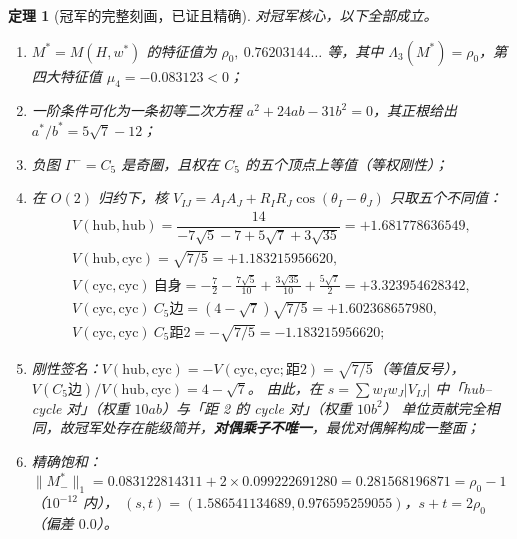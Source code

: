 \documentclass[UTF8,11pt]{ctexart}
\newtheorem{theorem}{定理}[section]
\theoremstyle{definition}
\newcommand{\Lam}{\Lambda}
\begin{document}
\begin{theorem}[冠军的完整刻画，已证且精确]\label{thm:champ}
对冠军核心，以下全部成立。
\begin{enumerate}[label=(\alph*),leftmargin=2em,itemsep=1pt]
\item $M^*=M(H,w^*)$ 的特征值为
$\rho_0,\ 0.76203144\ldots$ 等，其中 $\Lam_3(M^*)=\rho_0$，第四大特征值 $\mu_4=-0.083123<0$；
\item 一阶条件可化为一条初等二次方程 $a^2+24ab-31b^2=0$，其正根给出 $a^*/b^*=5\sqrt7-12$；
\item 负图 $\Gamma^-=C_5$ 是奇圈，且权在 $C_5$ 的五个顶点上等值（等权刚性）；
\item 在 $O(2)$ 归约下，核 $V_{IJ}=A_IA_J+R_IR_J\cos(\theta_I-\theta_J)$ 只取五个不同值：
\[
\begin{array}{lcl}
V(\text{hub},\text{hub})=\dfrac{14}{-7\sqrt5-7+5\sqrt7+3\sqrt{35}}=+1.681778636549,\\[4pt]
V(\text{hub},\text{cyc})=\sqrt{7/5}=+1.183215956620,\\[2pt]
V(\text{cyc},\text{cyc})\ \text{自身}=-\frac72-\frac{7\sqrt5}{10}+\frac{3\sqrt{35}}{10}+\frac{5\sqrt7}{2}=+3.323954628342,\\[2pt]
V(\text{cyc},\text{cyc})\ C_5\text{边}=(4-\sqrt7)\sqrt{7/5}=+1.602368657980,\\[2pt]
V(\text{cyc},\text{cyc})\ C_5\text{距}2=-\sqrt{7/5}=-1.183215956620 ;
\end{array}
\]
\item 刚性签名：$V(\text{hub},\text{cyc})=-V(\text{cyc},\text{cyc};\text{距}2)=\sqrt{7/5}$（等值反号），
$V(C_5\text{边})/V(\text{hub},\text{cyc})=4-\sqrt7$。
由此，在 $s=\sum w_Iw_J|V_{IJ}|$ 中「hub--cycle 对」（权重 $10ab$）与「距 2 的 cycle 对」（权重 $10b^2$）
单位贡献完全相同，故冠军处存在能级简并，\textbf{对偶乘子不唯一}，最优对偶解构成一整面；
\item 精确饱和：$\|M^*_{-}\|_1=0.083122814311+2\times0.099222691280=0.281568196871=\rho_0-1$（$10^{-12}$ 内），
$(s,t)=(1.586541134689,0.976595259055)$，$s+t=2\rho_0$（偏差 $0.0$）。
\end{enumerate}
\end{theorem}
\end{document}
